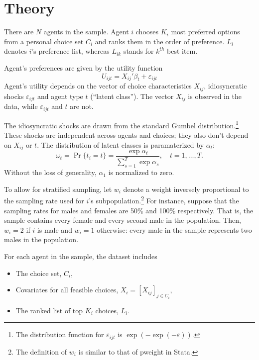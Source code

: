 \documentclass[12pt]{article}
\begin{document}
\section{Theory}

There are $N$ agents in the sample. Agent $i$ chooses $K_i$ most preferred options from a personal choice set $C_i$ and ranks them in the order of preference. $L_i$ denotes $i$'s preference list, whereas $L_{ik}$ stands for $k^{th}$ best item.

Agent's preferences are given by the utility function
\begin{equation*}
	U_{ijt} = X_{ij}'\beta_t + \varepsilon_{ijt}
\end{equation*}
Agent's utility depends on the vector of choice characteristics $X_{ij}$, idiosyncratic shocks $\varepsilon_{ijt}$ and agent type $t$ (``latent class''). The vector $X_{ij}$ is observed in the data, while $\varepsilon_{ijt}$ and $t$ are not.

The idiosyncratic shocks are drawn from the standard Gumbel distribution.\footnote{The distribution function for $\varepsilon_{ijt}$ is $\exp(-\exp(-\varepsilon))$.} These shocks are independent across agents and choices; they also don't depend on $X_{ij}$ or $t$. The distribution of latent classes is paramaterized by $\alpha_t$:
\begin{equation*}
	\omega_t = \Pr\{t_i=t\} = \frac{\exp\alpha_t}{\sum_{s=1}^T\exp\alpha_s}, \quad t=1,\dots,T.
\end{equation*}
Without the loss of generality, $\alpha_1$ is normalized to zero.

To allow for stratified sampling, let $w_i$ denote a weight inversely proportional to the sampling rate used for $i$'s subpopulation.\footnote{The definition of $w_i$ is similar to that of pweight in Stata.} For instance, suppose that the sampling rates for males and females are 50\% and 100\% respectively. That is, the sample contains every female and every second male in the population. Then, $w_i = 2$ if $i$ is male and $w_i=1$ otherwise: every male in the sample represents two males in the population.

For each agent in the sample, the dataset includes
\begin{itemize}
	\item The choice set, $C_i$,
	\item Covariates for all feasible choices, $X_i = [X_{ij}]_{j\in C_i}$,
	\item The ranked list of top $K_i$ choices, $L_i$.
\end{itemize}
\end{document}
